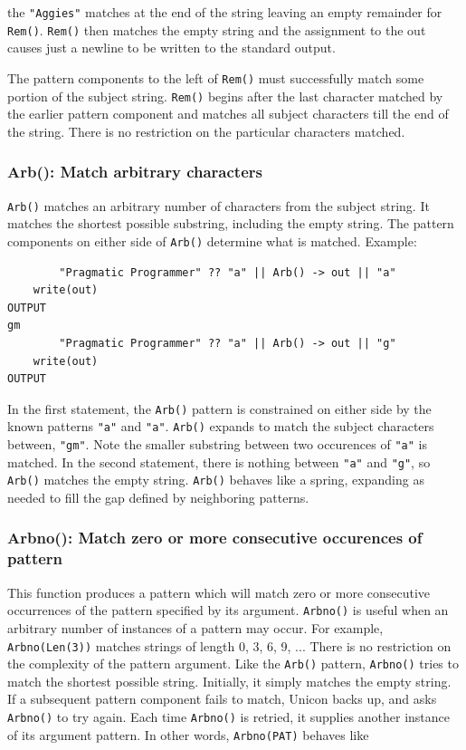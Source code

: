 \documentclass[letterpaper,12pt]{article}
\begin{document}
\noindent the {\tt "Aggies"} matches at the end of the string leaving an empty
remainder for {\tt Rem()}. {\tt Rem()} then matches the empty string
and the assignment to the out causes just a newline to be written to the
standard output.

The pattern components to the left of {\tt Rem()} must successfully match
some portion of the subject string. {\tt Rem()} begins after the last
character matched by the earlier pattern component and matches all
subject characters till the end of the string. There is no restriction
on the particular characters matched.

\subsubsection{Arb(): Match arbitrary characters}

{\tt Arb()} matches an arbitrary number of characters from the subject
string.  It matches the shortest possible substring, including the
empty string. The pattern components on either side of {\tt Arb()} determine
what is matched. Example:

\begin{verbatim}
        "Pragmatic Programmer" ?? "a" || Arb() -> out || "a"
	write(out)
OUTPUT
gm
        "Pragmatic Programmer" ?? "a" || Arb() -> out || "g"
	write(out)
OUTPUT

\end{verbatim}

In the first statement, the {\tt Arb()} pattern is constrained on either
side by the known patterns {\tt "a"} and {\tt "a"}.
{\tt Arb()} expands to match the
subject characters between, {\tt "gm"}. Note the smaller substring between
two occurences of {\tt "a"} is matched. In the second statement, there is
nothing between {\tt "a"} and {\tt "g"}, so {\tt Arb()} matches the empty
string. {\tt Arb()} behaves like a spring, expanding as needed to fill the
gap defined by neighboring patterns.

\subsubsection{Arbno(): Match zero or more consecutive occurences of pattern}

This function produces a pattern which will match zero or more
consecutive occurrences of the pattern specified by its
argument. {\tt Arbno()} is useful when an arbitrary number of instances of
a pattern may occur. For example, {\tt Arbno(Len(3))} matches strings of
length 0, 3, 6, 9, ... There is no restriction on the complexity of
the pattern argument.  Like the {\tt Arb()} pattern, {\tt Arbno()} tries to
match the shortest possible string. Initially, it simply matches the
empty string. If a subsequent pattern component fails to match, Unicon
backs up, and asks {\tt Arbno()} to try again. Each time {\tt Arbno()} is
retried, it supplies another instance of its argument pattern.  In
other words, {\tt Arbno(PAT)} behaves like
\end{document}
